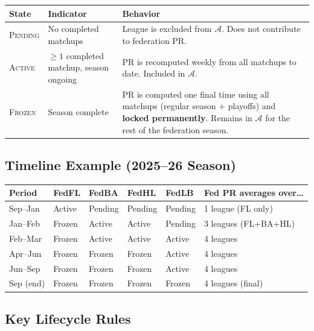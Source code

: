 \documentclass[11pt,a4paper]{article}
\begin{document}
\begin{table}[H]
\centering
\begin{tabular}{@{}lp{3.5cm}p{7cm}@{}}
\toprule
\textbf{State} & \textbf{Indicator} & \textbf{Behavior}\\
\midrule
\textsc{Pending} & No completed matchups & League is excluded from $\mathcal{A}$. Does not contribute to federation PR.\\
\textsc{Active} & $\geq 1$ completed matchup, season ongoing & PR is recomputed weekly from all matchups to date. Included in $\mathcal{A}$.\\
\textsc{Frozen} & Season complete & PR is computed one final time using all matchups (regular season + playoffs) and \textbf{locked permanently}. Remains in $\mathcal{A}$ for the rest of the federation season.\\
\bottomrule
\end{tabular}
\end{table}

\subsection{Timeline Example (2025--26 Season)}

\begin{table}[H]
\centering
\begin{tabular}{@{}lllllp{4.5cm}@{}}
\toprule
\textbf{Period} & \textbf{FedFL} & \textbf{FedBA} & \textbf{FedHL} & \textbf{FedLB} & \textbf{Fed PR averages over\ldots}\\
\midrule
Sep--Jan & Active & Pending & Pending & Pending & 1 league (FL only)\\
Jan--Feb & Frozen & Active & Active & Pending & 3 leagues (FL+BA+HL)\\
Feb--Mar & Frozen & Active & Active & Active & 4 leagues\\
Apr--Jun & Frozen & Frozen & Frozen & Active & 4 leagues\\
Jun--Sep & Frozen & Frozen & Frozen & Active & 4 leagues\\
Sep (end) & Frozen & Frozen & Frozen & Frozen & 4 leagues (final)\\
\bottomrule
\end{tabular}
\end{table}

\subsection{Key Lifecycle Rules}
\end{document}

